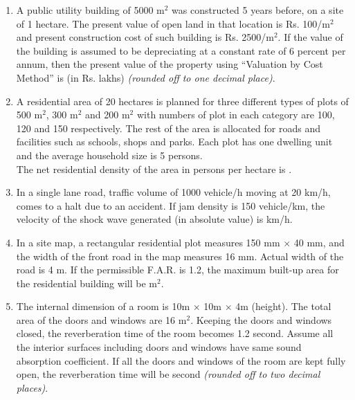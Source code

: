 \documentclass[12pt]{article}
\begin{document}
\begin{enumerate}[label=Q.\arabic*,start=26]
	\item A public utility building of 5000 m$^2$ was constructed 5 years before, on a site of 1 hectare. The present value of open land in that location is Rs. 100/m$^2$ and present construction cost of such building is Rs. 2500/m$^2$. If the value of the building is assumed to be depreciating at a constant rate of 6 percent per annum, then the present value of the property using “Valuation by Cost Method” is \underline{\hspace{2cm}} (in Rs. lakhs) \textit{(rounded off to one decimal place)}.

	\item A residential area of 20 hectares is planned for three different types of plots of 500 m$^2$, 300 m$^2$ and 200 m$^2$ with numbers of plot in each category are 100, 120 and 150 respectively. The rest of the area is allocated for roads and facilities such as schools, shops and parks. Each plot has one dwelling unit and the average household size is 5 persons.\\
		The net residential density of the area in persons per hectare is \underline{\hspace{2cm}}.

	\item In a single lane road, traffic volume of 1000 vehicle/h moving at 20 km/h, comes to a halt due to an accident. If jam density is 150 vehicle/km, the velocity of the shock wave generated (in absolute value) is \underline{\hspace{2cm}} km/h.

	\item In a site map, a rectangular residential plot measures 150 mm $\times$ 40 mm, and the width of the front road in the map measures 16 mm. Actual width of the road is 4 m. If the permissible F.A.R. is 1.2, the maximum built-up area for the residential building will be \underline{\hspace{2cm}} m$^2$.

	\item The internal dimension of a room is 10m $\times$ 10m $\times$ 4m (height). The total area of the doors and windows are 16 m$^2$. Keeping the doors and windows closed, the reverberation time of the room becomes 1.2 second. Assume all the interior surfaces including doors and windows have same sound absorption coefficient. If all the doors and windows of the room are kept fully open, the reverberation time will be \underline{\hspace{2cm}} second \textit{(rounded off to two decimal places)}.


\end{enumerate}
\end{document}
